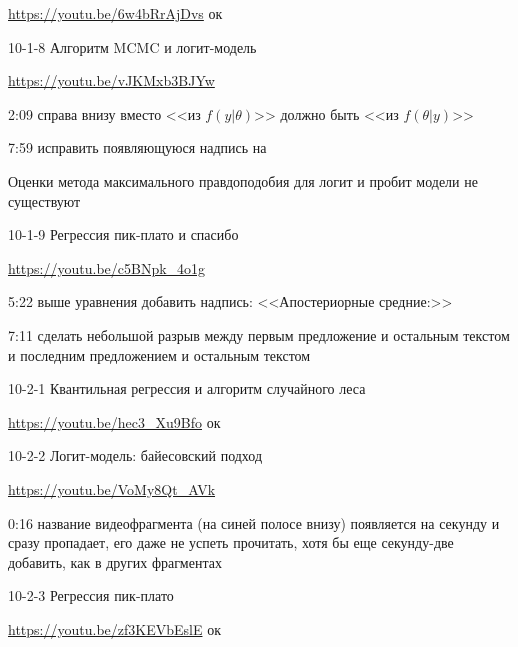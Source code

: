 \documentclass[12pt,a4paper]{article}
\begin{document}
\url{https://youtu.be/6w4bRrAjDvs} ок

10-1-8 Алгоритм MCMC и логит-модель

\url{https://youtu.be/vJKMxb3BJYw}

2:09 справа внизу вместо <<из $f(y|\theta)$>> должно быть <<из $f(\theta|y)$>> 

7:59 исправить появляющуюся надпись на 

Оценки метода максимального правдоподобия для логит и пробит модели не существуют

10-1-9 Регрессия пик-плато и спасибо 

\url{https://youtu.be/c5BNpk_4o1g}

5:22 выше уравнения добавить надпись: <<Апостериорные средние:>>

7:11 сделать небольшой разрыв между первым предложение и остальным текстом и последним предложением и остальным текстом 

10-2-1 Квантильная регрессия и алгоритм случайного леса

\url{https://youtu.be/hec3_Xu9Bfo} ок

10-2-2 Логит-модель: байесовский подход

\url{https://youtu.be/VoMy8Qt_AVk}

0:16 название видеофрагмента (на синей полосе внизу) появляется на секунду и сразу пропадает, его даже не успеть прочитать, хотя бы еще секунду-две добавить, как в других фрагментах

10-2-3 Регрессия пик-плато

\url{https://youtu.be/zf3KEVbEslE} ок
\end{document}
